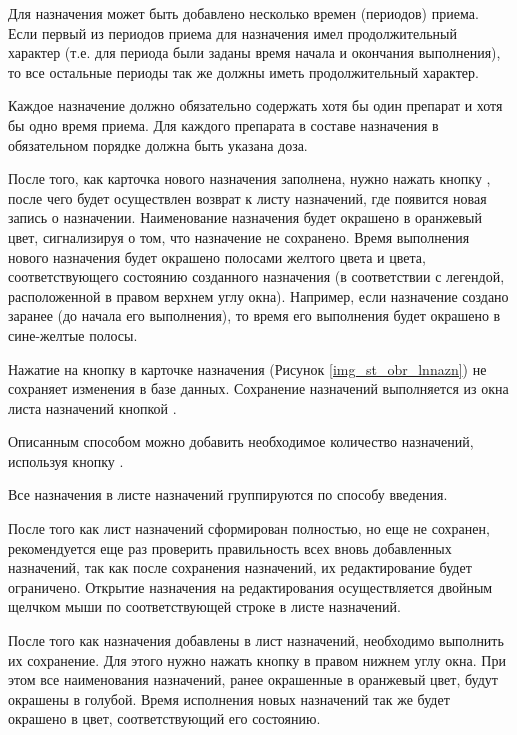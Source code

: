 Для назначения может быть добавлено несколько времен (периодов) приема. Если первый из периодов приема для назначения имел продолжительный характер (т.е. для периода были заданы время начала и окончания выполнения), то все остальные периоды так же должны иметь продолжительный характер. 

Каждое назначение должно обязательно содержать хотя бы один препарат и хотя бы одно время приема. Для каждого препарата в составе назначения в обязательном порядке должна быть указана доза.

После того, как карточка нового назначения заполнена, нужно нажать кнопку  , после чего будет осуществлен возврат к листу назначений, где появится новая запись о назначении. Наименование назначения будет окрашено в оранжевый цвет, сигнализируя о том, что назначение не сохранено. Время выполнения нового назначения будет окрашено полосами желтого цвета и цвета, соответствующего состоянию созданного назначения (в соответствии с легендой, расположенной в правом верхнем углу окна). Например, если назначение создано заранее (до начала его выполнения), то время его выполнения будет окрашено в сине-желтые полосы.

\begin{vnim}
 Нажатие на кнопку  в карточке назначения (Рисунок \ref{img_st_obr_lnnazn}) не сохраняет изменения в базе данных. Сохранение назначений выполняется из окна листа назначений кнопкой .
\end{vnim}
 
Описанным способом можно добавить необходимое количество назначений, используя кнопку .

Все назначения в листе назначений группируются по способу введения.

\begin{prim}
 После того как лист назначений сформирован полностью, но еще не сохранен, рекомендуется еще раз проверить правильность всех вновь добавленных назначений, так как после сохранения назначений, их редактирование будет ограничено. Открытие назначения на редактирования осуществляется двойным щелчком мыши по соответствующей строке в листе назначений.
\end{prim}
 
После того как назначения добавлены в лист назначений, необходимо выполнить их сохранение. Для этого нужно нажать кнопку   в правом нижнем углу окна. При этом все наименования назначений, ранее окрашенные в оранжевый цвет, будут окрашены в голубой. Время исполнения новых назначений так же будет окрашено в цвет, соответствующий его состоянию.

